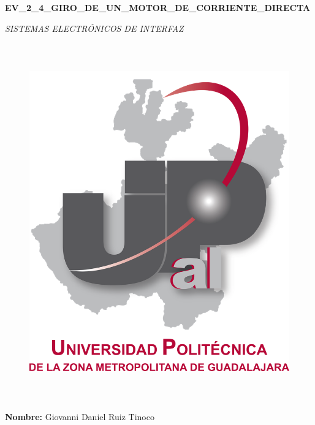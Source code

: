 \documentclass[12pt]{article}
\begin{document}
\begin{Center}
{\fontsize{14pt}{16.8pt}\selectfont \textbf{EV\_2\_4\_GIRO\_DE\_UN\_MOTOR\_DE\_CORRIENTE\_DIRECTA}\par}
\end{Center}\par

\begin{Center}
\textit{SISTEMAS ELECTRÓNICOS DE INTERFAZ}
\end{Center}\par


\vspace{\baselineskip}




\begin{figure}[H]
	\begin{Center}
		\includegraphics[width=5.24in,height=6.06in]{./media/image1.png}
	\end{Center}
\end{figure}


\par

\begin{Center}
\textbf{Nombre:} Giovanni Daniel Ruiz Tinoco
\end{Center}\par
\end{document}
